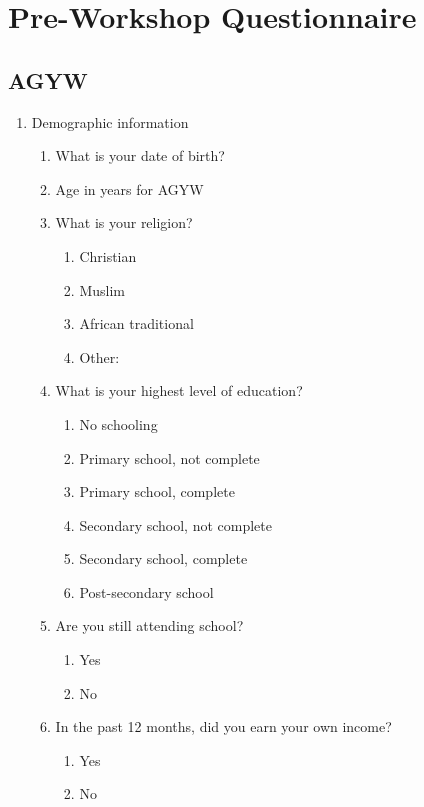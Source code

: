 \section{Pre-Workshop Questionnaire} \label{question}
\label{appendix}

\subsection{AGYW}
\begin{enumerate}
    \item Demographic information
    \begin{enumerate}
        \item What is your date of birth?
        \item Age in years for AGYW
        \item What is your religion?
        \begin{enumerate}
            \item Christian
            \item Muslim
            \item African traditional
            \item Other:
        \end{enumerate}
        \item What is your highest level of education?
        \begin{enumerate}
            \item No schooling
            \item Primary school, not complete
            \item Primary school, complete
            \item Secondary school, not complete
            \item Secondary school, complete
            \item Post-secondary school
        \end{enumerate}
        \item Are you still attending school?
        \begin{enumerate}
            \item Yes
            \item No
        \end{enumerate}
            \item In the past 12 months, did you earn your own income?
        \begin{enumerate}
            \item Yes
            \item No

\end{enumerate}
\end{enumerate}
\end{enumerate}
